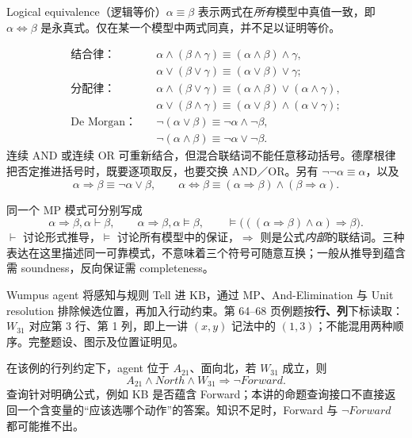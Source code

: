 
Logical equivalence（逻辑等价）$\alpha\equiv\beta$ 表示两式在\emph{所有}模型中真值一致，即 $\alpha\Leftrightarrow\beta$ 是永真式。仅在某一个模型中两式同真，并不足以证明等价。

\begin{align*}
 \text{结合律：}\quad
 &\alpha\land(\beta\land\gamma)\equiv(\alpha\land\beta)\land\gamma,\\
 &\alpha\lor(\beta\lor\gamma)\equiv(\alpha\lor\beta)\lor\gamma;\\[0.3em]
 \text{分配律：}\quad
 &\alpha\land(\beta\lor\gamma)\equiv(\alpha\land\beta)\lor(\alpha\land\gamma),\\
 &\alpha\lor(\beta\land\gamma)\equiv(\alpha\lor\beta)\land(\alpha\lor\gamma);\\[0.3em]
 \text{De Morgan：}\quad
 &\neg(\alpha\lor\beta)\equiv\neg\alpha\land\neg\beta,\\
 &\neg(\alpha\land\beta)\equiv\neg\alpha\lor\neg\beta.
\end{align*}
连续 AND 或连续 OR 可重新结合，但混合联结词不能任意移动括号。德摩根律把否定推进括号时，既要逐项取反，也要交换 AND／OR。另有 $\neg\neg\alpha\equiv\alpha$，以及
\[
 \alpha\Rightarrow\beta\equiv\neg\alpha\lor\beta,\qquad
 \alpha\Leftrightarrow\beta\equiv
 (\alpha\Rightarrow\beta)\land(\beta\Rightarrow\alpha).
\]

同一个 MP 模式可分别写成
\[
 \alpha\Rightarrow\beta,\alpha\vdash\beta,\qquad
 \alpha\Rightarrow\beta,\alpha\models\beta,\qquad
 \models\bigl(((\alpha\Rightarrow\beta)\land\alpha)\Rightarrow\beta\bigr).
\]
$\vdash$ 讨论形式推导，$\models$ 讨论所有模型中的保证，$\Rightarrow$ 则是公式\emph{内部}的联结词。三种表达在这里描述同一可靠模式，不意味着三个符号可随意互换；一般从推导到蕴含需 soundness，反向保证需 completeness。


Wumpus agent 将感知与规则 Tell 进 KB，通过 MP、And-Elimination 与 Unit resolution 排除候选位置，再加入行动约束。第 64--68 页例题按\textbf{行、列}下标读取：$W_{31}$ 对应第 3 行、第 1 列，即上一讲 $(x,y)$ 记法中的 $(1,3)$；不能混用两种顺序。完整题设、图示及位置证明见。

在该例的行列约定下，agent 位于 $A_{21}$、面向北，若 $W_{31}$ 成立，则
\[
 A_{21}\land North\land W_{31}\Rightarrow\neg Forward.
\]
查询针对明确公式，例如 KB 是否蕴含 Forward；本讲的命题查询接口不直接返回一个含变量的“应该选哪个动作”的答案。知识不足时，Forward 与 $\neg Forward$ 都可能推不出。


